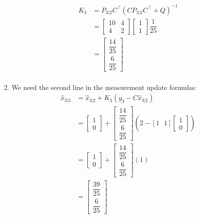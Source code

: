 \documentclass[letterpaper]{article}
\begin{document}
\begin{enumerate}
\begin{align*}
K_3 &= P_{3|2}C^\top \left(C P_{3|2} C^\top + Q\right)^{-1} \\
&= \left[ \begin{array}{rr} 10 & 4\\ 4 & 2\end{array} \right]\left[ \begin{array}{c} 1 \\ 1\end{array} \right] \dfrac{1}{25} \\
&=\left[ \begin{array}{c}  \dfrac{14}{25} \\[5 mm] \dfrac{6}{25}\end{array} \right]\\
\end{align*}

\item We need the second line in the measurement update formulas:
\begin{align*}
\widehat{x}_{3|3} &= \widehat{x}_{3|2}  + K_3 \left( y_3 - C \widehat{x}_{3|2} \right) \\
&= \left[ \begin{array}{c} 1 \\ 0\end{array} \right] + \left[ \begin{array}{c}  \dfrac{14}{25} \\[5 mm] \dfrac{6}{25}\end{array} \right] \left( 2 - [1~~~1] \left[ \begin{array}{c} 1 \\ 0\end{array} \right]  \right) \\
&= \left[ \begin{array}{c} 1 \\ 0\end{array} \right] + \left[ \begin{array}{c}  \dfrac{14}{25} \\[5 mm] \dfrac{6}{25}\end{array} \right]\left( 1  \right)\\
&=\left[ \begin{array}{c}  \dfrac{39}{25} \\[5 mm] \dfrac{6}{25}\end{array} \right]
\end{align*}


\end{enumerate}
\end{document}

